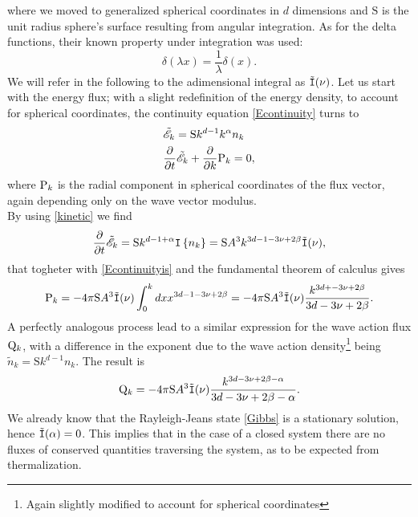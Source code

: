 where we moved to generalized spherical coordinates in $d$ dimensions and $\mathrm{S}$  is the unit radius sphere's surface
resulting from angular integration. 
As for the delta functions, their known property under integration was used:
\begin{equation*}
    \delta(\lambda x) = \frac{1}{\lambda} \delta (x).
\end{equation*}
We will refer in the following to the adimensional integral as $\tilde{\mathtt{I}}(\nu)$. 
Let us start with the energy flux; with a slight redefinition of the energy density,
to account for spherical coordinates, the continuity equation \eqref{Econtinuity} turns to 
\begin{align}
    &\tilde{\mathscr{E}}_k = \mathrm{S}k^{d-1}k^\alpha n_k \\
    &\frac{\partial}{\partial t} \tilde{\mathscr{E}}_k + \frac{\partial}{\partial k}  \mathrm{P}_k = 0,
    \label{Econtinuityis}
\end{align}
where $\mathrm{P}_k$ is the radial component in spherical coordinates of the flux vector,
again depending only on the wave vector modulus.\\
By using \eqref{kinetic} we find
\begin{equation}
    \frac{\partial}{\partial t} \tilde{\mathscr{E}}_k = \mathrm{S} k^{d-1+\alpha} \mathtt{I}\left\{n_k\right\} = \mathrm{S} A^3 k^{3d-1-3\nu +2\beta} \tilde{\mathtt{I}}(\nu),
\end{equation}
that togheter with \eqref{Econtinuityis} and the fundamental theorem of calculus gives 
\begin{equation}
    \mathrm{P}_k = - 4\pi \mathrm{S} A^3 \tilde{\mathtt{I}}(\nu) \int_{0}^{k} dx x^{3d-1-3\nu +2\beta} = - 4\pi \mathrm{S} A^3 \tilde{\mathtt{I}}(\nu) 
    \frac{k^{3d+-3\nu +2\beta}}{3d-3\nu +2\beta}.
    \label{KZP}
\end{equation} 
A perfectly analogous process lead to a similar expression for the wave action flux $\mathrm{Q}_k$, with a difference in the exponent due to the wave action 
density\footnote{Again slightly modified to account for spherical coordinates} being $\tilde{n}_k=\mathrm{S}k^{d-1}n_k$. The result is
\begin{equation}
    \mathrm{Q}_k = - 4\pi \mathrm{S} A^3 \tilde{\mathtt{I}}(\nu) \frac{k^{3d-3\nu +2\beta-\alpha}}{3d-3\nu +2\beta-\alpha}.
    \label{KZQ}
\end{equation}
We already know that the Rayleigh-Jeans state \eqref{Gibbs} is a stationary solution, hence $\tilde{\mathtt{I}}(\alpha) = 0$. This implies that in the case of a closed system there are no
fluxes of conserved quantities traversing the system, as to be expected from thermalization. \\ 

